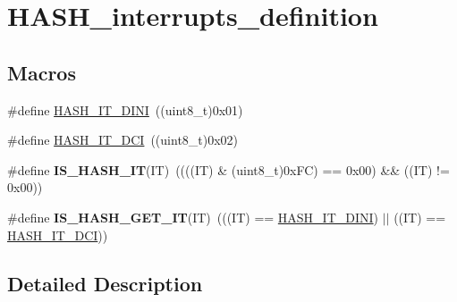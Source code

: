 \hypertarget{group___h_a_s_h__interrupts__definition}{\section{H\-A\-S\-H\-\_\-interrupts\-\_\-definition}
\label{group___h_a_s_h__interrupts__definition}
}
\subsection*{Macros}
\begin{DoxyCompactItemize}
\item 
\#define \hyperlink{group___h_a_s_h__interrupts__definition_ga0df296dbab5028378cc21ad733eb5675}{H\-A\-S\-H\-\_\-\-I\-T\-\_\-\-D\-I\-N\-I}~((uint8\-\_\-t)0x01)
\item 
\#define \hyperlink{group___h_a_s_h__interrupts__definition_gab5285b1618e3fac906d7502261d9bb38}{H\-A\-S\-H\-\_\-\-I\-T\-\_\-\-D\-C\-I}~((uint8\-\_\-t)0x02)
\item 
\hypertarget{group___h_a_s_h__interrupts__definition_gabaf192c1ebff9bebe380d01b4c3006fe}{\#define {\bfseries I\-S\-\_\-\-H\-A\-S\-H\-\_\-\-I\-T}(I\-T)~((((I\-T) \& (uint8\-\_\-t)0x\-F\-C) == 0x00) \&\& ((\-I\-T) != 0x00))}\label{group___h_a_s_h__interrupts__definition_gabaf192c1ebff9bebe380d01b4c3006fe}

\item 
\hypertarget{group___h_a_s_h__interrupts__definition_gaf6b9b0113009e2bb8f8d462b714313af}{\#define {\bfseries I\-S\-\_\-\-H\-A\-S\-H\-\_\-\-G\-E\-T\-\_\-\-I\-T}(I\-T)~(((I\-T) == \hyperlink{group___h_a_s_h__interrupts__definition_ga0df296dbab5028378cc21ad733eb5675}{H\-A\-S\-H\-\_\-\-I\-T\-\_\-\-D\-I\-N\-I}) $|$$|$ ((I\-T) == \hyperlink{group___h_a_s_h__interrupts__definition_gab5285b1618e3fac906d7502261d9bb38}{H\-A\-S\-H\-\_\-\-I\-T\-\_\-\-D\-C\-I}))}\label{group___h_a_s_h__interrupts__definition_gaf6b9b0113009e2bb8f8d462b714313af}

\end{DoxyCompactItemize}


\subsection{Detailed Description}


